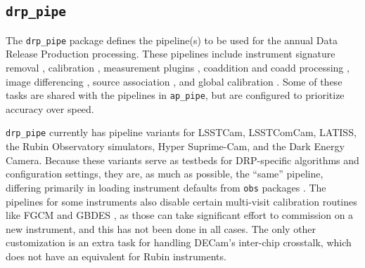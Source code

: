 \subsection{\texttt{drp\_pipe}}
\label{sec:drp_pipe}

The \texttt{drp\_pipe} package defines the pipeline(s) to be used for the annual Data Release Production processing.
These pipelines include instrument signature removal , calibration , measurement plugins , coaddition and coadd processing , image differencing , source association , and global calibration .
Some of these tasks are shared with the pipelines in \texttt{ap\_pipe}, but are configured to prioritize accuracy over speed.

\texttt{drp\_pipe} currently has pipeline variants for LSSTCam, LSSTComCam, LATISS, the Rubin Observatory simulators, Hyper Suprime-Cam, and the Dark Energy Camera.
Because these variants serve as testbeds for DRP-specific algorithms and configuration settings, they are, as much as possible, the ``same'' pipeline, differing primarily in loading instrument defaults from \texttt{obs} packages .
The pipelines for some instruments also disable certain multi-visit calibration routines like FGCM  and GBDES , as those can take significant effort to commission on a new instrument, and this has not been done in all cases.
The only other customization is an extra task for handling DECam's inter-chip crosstalk, which does not have an equivalent for Rubin instruments.
